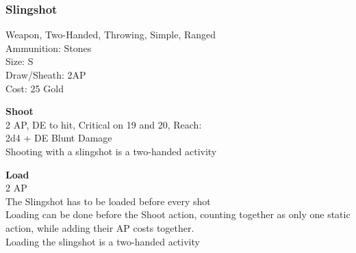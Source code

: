 \subsubsection{Slingshot}\label{weapon:slingshot}
Weapon, Two-Handed, Throwing, Simple, Ranged\\
Ammunition: Stones\\
Size: S\\
Draw/Sheath: 2AP\\
Cost: 25 Gold

\textbf{Shoot}\\
2 AP, DE to hit, Critical on 19 and 20,  Reach:\\
2d4 + \texttimes DE Blunt Damage\\
Shooting with a slingshot is a two-handed activity

\textbf{Load}\\
2 AP\\
The Slingshot has to be loaded before every shot\\
Loading can be done before the Shoot action, counting together as only one static action, while adding their AP costs together.\\
Loading the slingshot is a two-handed activity
